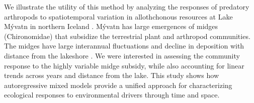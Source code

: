 We illustrate the utility of this method by analyzing the responses of predatory
arthropods to spatiotemporal variation in allothchonous resources \citep{Polis1997}
at Lake M\'{y}vatn in northern Iceland \citep{Einarsson2004}.
M\'{y}vatn has large emergences of midges
(Chironomidae) that subsidize the terrestrial plant \citep{Gratton2008}
and arthropod \citep{Dreyer2012, Sanchez2018} communities.
The midges have large interannual fluctuations \citep{Gardarsson2004}
and decline in deposition with distance from the lakeshore \citep{Dreyer2015}.
We were interested in assessing the community response to
the highly variable midge subsidy, while also accounting for linear trends across years
and distance from the lake.
This study shows how autoregressive mixed models provide a unified approach
for characterizing ecological responses to environmental drivers through time and space.
